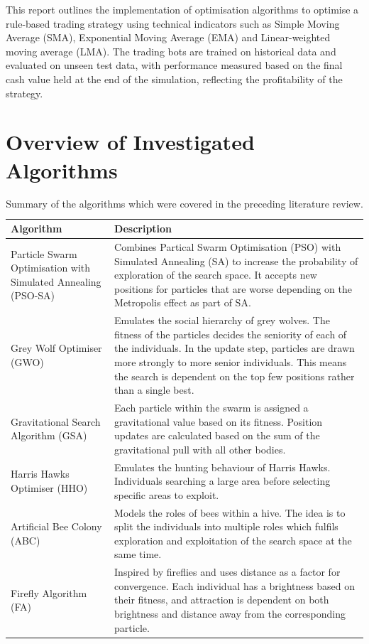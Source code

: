 \documentclass[a4paper, 12pt]{extarticle}
\begin{document}
This report outlines the implementation of optimisation algorithms to optimise a rule-based trading strategy using technical indicators such as Simple Moving Average (SMA), Exponential Moving Average (EMA) and Linear-weighted moving average (LMA). The trading bots are trained on historical data and evaluated on unseen test data, with performance measured based on the final cash value held at the end of the simulation, reflecting the profitability of the strategy. 

\newpage

\section{Overview of Investigated Algorithms}

\begin{table}[h!]
    \centering
    \begin{tabularx}{\textwidth}{X X}
      \toprule
      \textbf{Algorithm} & \textbf{Description}\\
      \midrule
      Particle Swarm Optimisation with Simulated Annealing (PSO-SA) \cite{psosa} & Combines Partical Swarm Optimisation (PSO) \cite{pso} with Simulated Annealing (SA) to increase the probability of exploration of the search space. It accepts new positions for particles that are worse depending on the Metropolis effect as part of SA. \\
      Grey Wolf Optimiser (GWO) \cite{wolf} & Emulates the social hierarchy of grey wolves. The fitness of the particles decides the seniority of each of the individuals. In the update step, particles are drawn more strongly to more senior individuals. This means the search is dependent on the top few positions rather than a single best.\\
      Gravitational Search Algorithm (GSA) \cite{GSA} & Each particle within the swarm is assigned a gravitational value based on its fitness. Position updates are calculated based on the sum of the gravitational pull with all other bodies.\\
      Harris Hawks Optimiser (HHO) \cite{hawks} & Emulates the hunting behaviour of Harris Hawks. Individuals searching a large area before selecting specific areas to exploit.\\
      Artificial Bee Colony (ABC) \cite{abc} & Models the roles of bees within a hive. The idea is to split the individuals into multiple roles which fulfils exploration and exploitation of the search space at the same time.\\
      Firefly Algorithm (FA) \cite{firefly}& Inspired by fireflies and uses distance as a factor for convergence. Each individual has a brightness based on their fitness, and attraction is dependent on both brightness and distance away from the corresponding particle.\\ 
      \bottomrule
    \end{tabularx}
    \caption{Summary of the algorithms which were covered in the preceding literature review.}
    \label{tab:algorithms}
  \end{table}
\end{document}
